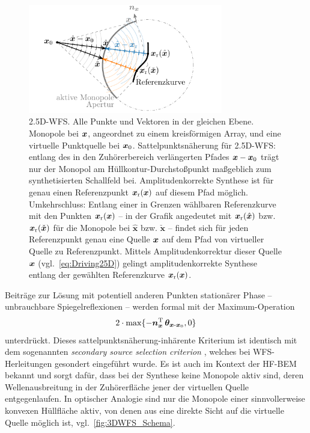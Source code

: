 \begin{figure}[t]
\centering
\begin{plotfigures}
\includegraphics[width=85mm]{../graphics_DEU/spa_25d.pdf}
\end{plotfigures}
\caption{2.5D-WFS. Alle Punkte und Vektoren in der gleichen Ebene.
%
Monopole bei $\bm{x}$, angeordnet zu einem kreisförmigen Array, und eine
virtuelle Punktquelle bei $\bm{x}_\mathrm{0}$.
%
Sattelpunktsnäherung für 2.5D-WFS:
entlang des in den Zuhörerbereich verlängerten Pfades $\bm{x} - \bm{x}_\mathrm{0}$ trägt nur der
Monopol am Hüllkontur-Durchstoßpunkt maßgeblich zum synthetisierten
Schallfeld bei.
%
Amplitudenkorrekte Synthese ist für genau einen Referenzpunkt
$\bm{x}_\mathrm{r}(\bm{x})$ auf diesem Pfad möglich.
%
Umkehrschluss: Entlang einer in Grenzen wählbaren Referenzkurve mit den Punkten
$\bm{x}_\mathrm{r}(\bm{x})$ -- in der Grafik angedeutet mit
$\bm{x}_\mathrm{r}(\hat{\bm{x}})$ bzw. $\bm{x}_\mathrm{r}(\check{\bm{x}})$
für die Monopole bei $\hat{\bm{x}}$ bzw.
$\check{\bm{x}}$ -- findet sich für jeden Referenzpunkt genau eine Quelle $\bm{x}$
auf dem Pfad von virtueller Quelle zu Referenzpunkt.
%
Mittels Amplitudenkorrektur dieser Quelle $\bm{x}$ (vgl.~\Glg\eqref{eq:Driving25D})
gelingt amplitudenkorrekte
Synthese entlang der gewählten Referenzkurve $\bm{x}_\mathrm{r}(\bm{x})$.
%
\cc
}
\label{fig:25DWFS_Schema}
\end{figure}
%
Beiträge zur Lösung mit potentiell anderen Punkten stationärer Phase
-- unbrauchbare Spiegelreflexionen \cite{ZotterSchultz2020_White} -- werden
formal mit der Maximum-Operation
\begin{align}
\label{eq:SecSrcSel}
2\cdot\mathrm{max}\{-\bm{n}^\mathrm{T}_{\bm{x}} \, \bm{\theta}_{\bm{x}\text{-}\bm{x}_\mathrm{0}}, 0\}
\end{align}
unterdrückt.
Dieses sattelpunktsnäherung-inhärente Kriterium ist identisch mit dem sogenannten
\textit{secondary source selection criterion}
 \cite{Nicol1999, Spors2007b, Spors2008a},
welches bei WFS-Herleitungen gesondert eingeführt wurde.
%
Es ist auch im Kontext der HF-BEM bekannt und sorgt dafür,
dass bei der Synthese keine Monopole aktiv sind,
deren Wellenausbreitung in der Zuhörerfläche jener der virtuellen Quelle
entgegenlaufen.
%
In optischer Analogie sind nur die Monopole einer sinnvollerweise konvexen
Hüllfläche aktiv, von denen aus eine direkte Sicht auf die virtuelle Quelle
möglich ist, vgl.~\Abb\ref{fig:3DWFS_Schema}.



